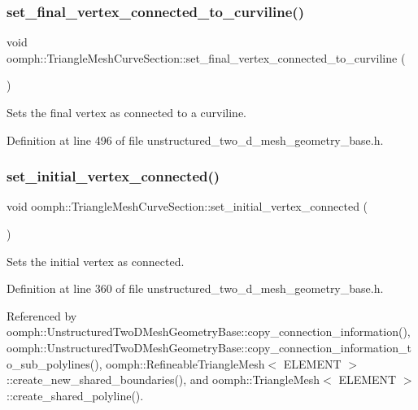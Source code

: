 \subsubsection{\texorpdfstring{set\+\_\+final\+\_\+vertex\+\_\+connected\+\_\+to\+\_\+curviline()}{set\_final\_vertex\_connected\_to\_curviline()}}
{\footnotesize\ttfamily void oomph\+::\+Triangle\+Mesh\+Curve\+Section\+::set\+\_\+final\+\_\+vertex\+\_\+connected\+\_\+to\+\_\+curviline (\begin{DoxyParamCaption}{ }\end{DoxyParamCaption})\hspace{0.3cm}{\ttfamily [inline]}}



Sets the final vertex as connected to a curviline. 



Definition at line 496 of file unstructured\+\_\+two\+\_\+d\+\_\+mesh\+\_\+geometry\+\_\+base.\+h.

\mbox{\label{classoomph_1_1TriangleMeshCurveSection_ab3294da2b5f14d38e19f2b64684f3074}} 
\subsubsection{\texorpdfstring{set\+\_\+initial\+\_\+vertex\+\_\+connected()}{set\_initial\_vertex\_connected()}}
{\footnotesize\ttfamily void oomph\+::\+Triangle\+Mesh\+Curve\+Section\+::set\+\_\+initial\+\_\+vertex\+\_\+connected (\begin{DoxyParamCaption}{ }\end{DoxyParamCaption})\hspace{0.3cm}{\ttfamily [inline]}}



Sets the initial vertex as connected. 



Definition at line 360 of file unstructured\+\_\+two\+\_\+d\+\_\+mesh\+\_\+geometry\+\_\+base.\+h.



Referenced by oomph\+::\+Unstructured\+Two\+D\+Mesh\+Geometry\+Base\+::copy\+\_\+connection\+\_\+information(), oomph\+::\+Unstructured\+Two\+D\+Mesh\+Geometry\+Base\+::copy\+\_\+connection\+\_\+information\+\_\+to\+\_\+sub\+\_\+polylines(), oomph\+::\+Refineable\+Triangle\+Mesh$<$ E\+L\+E\+M\+E\+N\+T $>$\+::create\+\_\+new\+\_\+shared\+\_\+boundaries(), and oomph\+::\+Triangle\+Mesh$<$ E\+L\+E\+M\+E\+N\+T $>$\+::create\+\_\+shared\+\_\+polyline().

